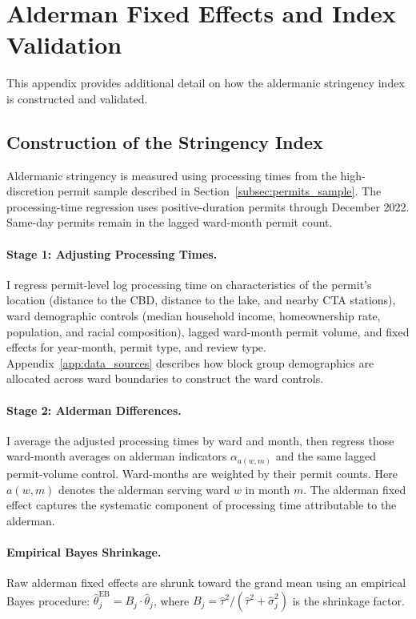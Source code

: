 
\section{Alderman Fixed Effects and Index Validation}
\label{sec:appendix_alderman_fe}

This appendix provides additional detail on how the aldermanic stringency index is constructed and validated.

\subsection{Construction of the Stringency Index}

Aldermanic stringency is measured using processing times from the high-discretion permit sample described in Section~\ref{subsec:permits_sample}.
The processing-time regression uses positive-duration permits through December 2022.
Same-day permits remain in the lagged ward-month permit count.

\paragraph{Stage 1: Adjusting Processing Times.}
I regress permit-level log processing time on characteristics of the permit's location (distance to the CBD, distance to the lake, and nearby CTA stations), ward demographic controls (median household income, homeownership rate, population, and racial composition), lagged ward-month permit volume, and fixed effects for year-month, permit type, and review type.
Appendix~\ref{app:data_sources} describes how block group demographics are allocated across ward boundaries to construct the ward controls.

\paragraph{Stage 2: Alderman Differences.}
I average the adjusted processing times by ward and month, then regress those ward-month averages on alderman indicators $\alpha_{a(w,m)}$ and the same lagged permit-volume control.
Ward-months are weighted by their permit counts.
Here $a(w,m)$ denotes the alderman serving ward $w$ in month $m$.
The alderman fixed effect captures the systematic component of processing time attributable to the alderman.

\paragraph{Empirical Bayes Shrinkage.}
Raw alderman fixed effects are shrunk toward the grand mean using an empirical Bayes procedure: $\hat{\theta}_j^{\text{EB}} = B_j \cdot \hat{\theta}_j$, where $B_j = \hat{\tau}^2/(\hat{\tau}^2 + \hat{\sigma}_j^2)$ is the shrinkage factor.

